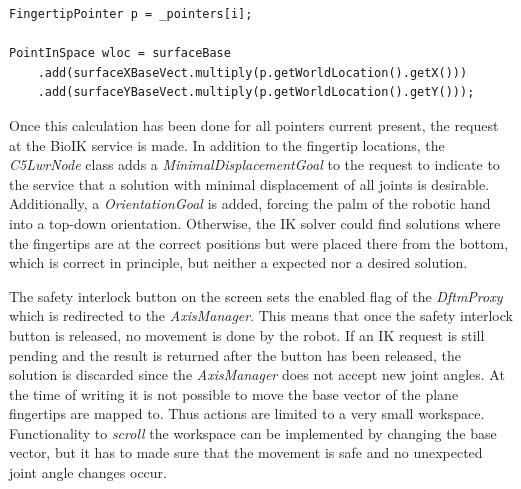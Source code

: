 \begin{lstlisting}[caption={Mapping of points from two into three dimensions},label=lst:impl:dftm:mapping]
FingertipPointer p = _pointers[i];

PointInSpace wloc = surfaceBase
	.add(surfaceXBaseVect.multiply(p.getWorldLocation().getX()))
	.add(surfaceYBaseVect.multiply(p.getWorldLocation().getY()));
\end{lstlisting}

Once this calculation has been done for all pointers current present, the request at the BioIK service is made. In addition to the fingertip locations, the \textit{C5LwrNode} class adds a \textit{MinimalDisplacementGoal} to the request to indicate to the service that a solution with minimal displacement of all joints is desirable. Additionally, a \textit{OrientationGoal} is added, forcing the palm of the robotic hand into a top-down orientation. Otherwise, the IK solver could find solutions where the fingertips are at the correct positions but were placed there from the bottom, which is correct in principle, but neither a expected nor a desired solution.

The safety interlock button on the screen sets the enabled flag of the \textit{DftmProxy} which is redirected to the \textit{AxisManager}. This means that once the safety interlock button is released, no movement is done by the robot. If an IK request is still pending and the result is returned after the button has been released, the solution is discarded since the \textit{AxisManager} does not accept new joint angles. At the time of writing it is not possible to move the base vector of the plane fingertips are mapped to. Thus actions are limited to a very small workspace. Functionality to \textit{scroll} the workspace can be implemented by changing the base vector, but it has to made sure that the movement is safe and no unexpected joint angle changes occur.